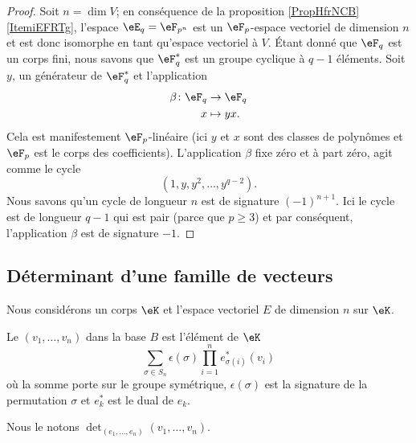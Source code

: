 \begin{proof}
    Soit \( n=\dim V\); en conséquence de la proposition \ref{PropHfrNCB}\ref{ItemiEFRTg}, l'espace \( \eE_q=\eF_{p^n}\) est un \( \eF_p\)-espace vectoriel de dimension \( n\) et est donc isomorphe en tant qu'espace vectoriel à \( V\). Étant donné que \( \eF_q\) est un corps fini, nous savons que \( \eF_q^*\) est un groupe cyclique à \( q-1\) éléments. Soit \( y\), un générateur de \( \eF_q^*\) et l'application
    \begin{equation}
        \begin{aligned}
            \beta\colon \eF_q&\to \eF_q \\
            x&\mapsto yx. 
        \end{aligned}
    \end{equation}
    Cela est manifestement \( \eF_p\)-linéaire (ici \( y\) et \( x\) sont des classes de polynômes et \( \eF_p\) est le corps des coefficients). L'application \( \beta\) fixe zéro et à part zéro, agit comme le cycle
    \begin{equation}
        (1,y,y^2,\ldots, y^{q-2}).
    \end{equation}
    Nous savons qu'un cycle de longueur \( n\) est de signature \( (-1)^{n+1}\). Ici le cycle est de longueur \( q-1\) qui est pair (parce que \( p\geq 3\)) et par conséquent, l'application \( \beta\) est de signature \( -1\).
\end{proof}

\subsection{Déterminant d'une famille de vecteurs}

Nous considérons un corps \( \eK\) et l'espace vectoriel \( E\) de dimension \( n\) sur \( \eK\).

\begin{definition}
    Le  \( (v_1,\ldots, v_n)\) dans la base \( B\) est l'élément de \( \eK\)
    \begin{equation}
        \sum_{\sigma\in S_n}\epsilon(\sigma)\prod_{i=1}^ne^*_{\sigma(i)}(v_i)
    \end{equation}
    où la somme porte sur le groupe symétrique, \( \epsilon(\sigma)\) est la signature de la permutation \( \sigma\) et \( e_k^*\) est le dual de \( e_k\).

    Nous le notons \( \det_{(e_1,\ldots, e_n)}(v_1,\ldots, v_n)\).
\end{definition}

